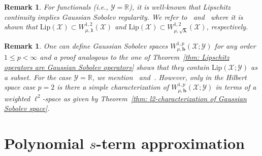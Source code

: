 \documentclass[namedate,webpdf]{ima-authoring-template-blank}
\newcommand*{\Lip}{\mathrm{Lip}}  %
\newcounter{counter}
\numberwithin{counter}{section}
\numberwithin{equation}{section}
\theoremstyle{plain}
\newtheorem{remark}[counter]{Remark}
\theoremstyle{definition}
\newcommand*{\cX}{\mathcal{X}}
\newcommand*{\cY}{\mathcal{Y}}
\newcommand*{\bbR}{\mathbb{R}}
\theoremstyle{thmstyletwo}
\begin{document}
\begin{remark}
    For functionals (i.e., \(\cY = \bbR\)), it is well-known that Lipschitz continuity implies Gaussian Sobolev regularity. We refer to~\citet[Prop. 10.11]{daprato_IntroductionInfiniteDimensionalAnalysis_2006} and~\citet[Prop. 3.18]{daprato_IntroductionStochasticAnalysisMalliavin_2014} where it is shown that \(\Lip(\cX) \subset W_{\mu, \bm{1}}^{1,2}(\cX)\) and \(\Lip(\cX) \subset W_{\mu, \sqrt{\bm{\lambda}}}^{1,2}(\cX)\), respectively.
\end{remark}

\begin{remark}
    One can define Gaussian Sobolev spaces \(W_{\mu, \bm{b}}^{1,p}(\cX; \cY)\) for any order \(1 \leq p < \infty\) and a proof analogous to the one of Theorem~\ref{thm: Lipschitz operators are Gaussian Sobolev operators} shows that they contain \(\Lip(\cX; \cY)\) as a subset. For the case \(\cY = \bbR\), we mention~\citet[Ex. 5.4.10(i)]{bogachev_GaussianMeasures_1998} and~\citet[Prop. 10.1.4]{lunardi_InfiniteDimensionalAnalysis_2015}. However, only in the Hilbert space case \(p = 2\) is there a simple characterization of \(W_{\mu, \bm{b}}^{1,p}(\cX; \cY)\) in terms of a weighted \(\ell^2\)-space as given by Theorem~\ref{thm: l2-characterization of Gaussian Sobolev space}.
\end{remark}







\section{Polynomial \texorpdfstring{\(s\)}{s}-term approximation}
\label{sec: polynomial s-term approximation}
\end{document}
